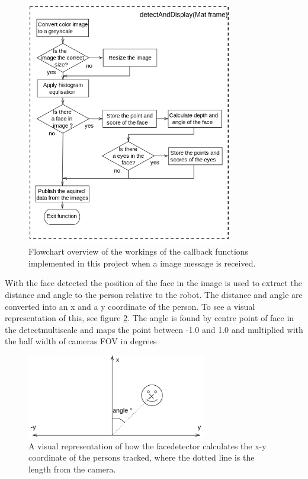 \begin{figure}[H]
    \centering
    \includegraphics[width=0.8\textwidth]{figures/color_face_flow.png}
    \caption{Flowchart overview of the workings of the callback functions implemented in this project when a image message is received.}
    \label{fig:flowchartDetectface}
\end{figure}

With the face detected the position of the face in the image is used to extract the distance and angle to the person relative to the robot. The distance and angle are converted into an x and a y coordinate of the person. To see a visual representation of this, see figure \ref{fig:lidscan}. The angle is found by centre point of face in the detectmultiscale and maps the point between -1.0 and 1.0 and multiplied with the half width of cameras FOV in degrees
    

\begin{figure}[H]
    \centering
    \includegraphics[width=0.7\textwidth]{figures/cameraview1.png}
    \caption{A visual representation of how the facedetector calculates the x-y coordinate of the persons tracked, where the dotted line is the length from the camera.}
    \label{fig:lidscan}
\end{figure}


